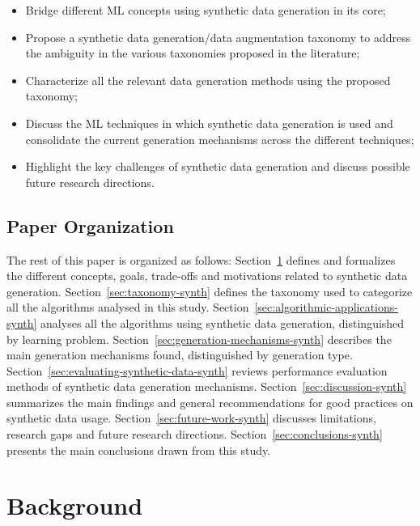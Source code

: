 \begin{itemize}

    \item Bridge different ML concepts using synthetic data generation in its
        core;

    \item Propose a synthetic data generation/data augmentation taxonomy to
        address the ambiguity in the various taxonomies proposed in the
        literature;

    \item Characterize all the relevant data generation methods using the
        proposed taxonomy;

    \item Discuss the ML techniques in which synthetic data generation is used
        and consolidate the current generation mechanisms across the
        different techniques;

    \item Highlight the key challenges of synthetic data generation and
        discuss possible future research directions.

\end{itemize}

\subsection{Paper Organization}

The rest of this paper is organized as follows: Section~\ref{sec:background-synth}
defines and formalizes the different concepts, goals, trade-offs and
motivations related to synthetic data generation. Section~\ref{sec:taxonomy-synth}
defines the taxonomy used to categorize all the algorithms analysed in this
study. Section~\ref{sec:algorithmic-applications-synth} analyses all the algorithms
using synthetic data generation, distinguished by learning problem.
Section~\ref{sec:generation-mechanisms-synth} describes the main generation
mechanisms found, distinguished by generation type.
Section~\ref{sec:evaluating-synthetic-data-synth} reviews performance evaluation
methods of synthetic data generation mechanisms. Section~\ref{sec:discussion-synth}
summarizes the main findings and general recommendations for good practices on
synthetic data usage. Section~\ref{sec:future-work-synth} discusses limitations,
research gaps and future research directions. Section~\ref{sec:conclusions-synth}
presents the main conclusions drawn from this study.

\section{Background}\label{sec:background-synth}

